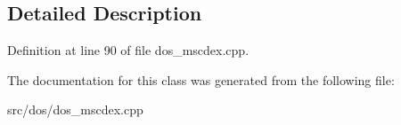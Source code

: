 \subsection{Detailed Description}


Definition at line 90 of file dos\-\_\-mscdex.\-cpp.



The documentation for this class was generated from the following file\-:\begin{DoxyCompactItemize}
\item 
src/dos/dos\-\_\-mscdex.\-cpp\end{DoxyCompactItemize}
